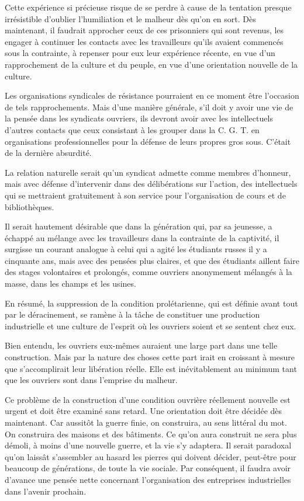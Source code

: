 \documentclass[french,twoside]{book} %
\begin{document}
Cette expérience si précieuse risque de se perdre à cause de la tentation presque irrésistible d'oublier l'humiliation et le malheur dès qu'on en sort. Dès maintenant, il faudrait approcher ceux de ces prisonniers qui sont revenus, les engager à continuer les contacts avec les travailleurs qu'ils avaient commencés sous la contrainte, à repenser pour eux leur expérience récente, en vue d'un rapprochement de la culture et du peuple, en vue d'une orientation nouvelle de la culture.\par
Les organisations syndicales de résistance pourraient en ce moment être l'occasion de tels rapprochements. Mais d'une manière générale, s'il doit y avoir une vie de la pensée dans les syndicats ouvriers, ils devront avoir avec les intellectuels d'autres contacts que ceux consistant à les grouper dans la C. G. T. en organisations professionnelles pour la défense de leurs propres gros sous. C'était de la dernière absurdité.\par
La relation naturelle serait qu'un syndicat admette comme membres d'honneur, mais avec défense d'intervenir dans des délibérations sur l'action, des intellectuels qui se mettraient gratuitement à son service pour l'organisation de cours et de bibliothèques.\par
Il serait hautement désirable que dans la génération qui, par sa jeunesse, a échappé au mélange avec les travailleurs dans la contrainte de la captivité, il surgisse un courant analogue à celui qui a agité les étudiants russes il y a cinquante ans, mais avec des pensées plus claires, et que des étudiants aillent faire des stages volontaires et prolongés, comme ouvriers anonymement mélangés à la masse, dans les champs et les usines.\par
En résumé, la suppression de la condition prolétarienne, qui est définie avant tout par le déracinement, se ramène à la tâche de constituer une production industrielle et une culture de l'esprit où les ouvriers soient et se sentent chez eux.\par
Bien entendu, les ouvriers eux-mêmes auraient une large part dans une telle construction. Mais par la nature des choses cette part irait en croissant à mesure que s'accomplirait leur libération réelle. Elle est inévitablement au minimum tant que les ouvriers sont dans l'emprise du malheur.\par
Ce problème de la construction d'une condition ouvrière réellement nouvelle est urgent et doit être examiné sans retard. Une orientation doit être décidée dès maintenant. Car aussitôt la guerre finie, on construira, au sens littéral du mot. On construira des maisons et des bâtiments. Ce qu'on aura construit ne sera plus démoli, à moins d'une nouvelle guerre, et la vie s'y adaptera. Il serait paradoxal qu'on laissât s'assembler au hasard les pierres qui doivent décider, peut-être pour beaucoup de générations, de toute la vie sociale. Par conséquent, il faudra avoir d'avance une pensée nette concernant l'organisation des entreprises industrielles dans l'avenir prochain.\par
\end{document}
